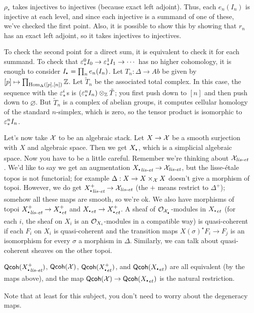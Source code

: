 $\rho_*$ takes injectives to injectives (because exact left adjoint).
Thus, each $e_n(I_n)$ is injective at each level, and since each
injective is a summand of one of these, we've checked the first
point. Also, it is possible to show this by showing that $r_n$ has an
exact left adjoint, so it takes injectives to injectives.

To check the second point for a direct sum, it is equivalent to check
it for each summand. To check that $\varepsilon_*^0I_0\to \varepsilon_*^1I_1\to\cdots$
has no higher cohomology, it is enough to consider $I_\udot = \prod_n
e_n(I_n)$. Let $T_n:\Delta\to Ab$ be given by $[p]\mapsto
\prod_{\operatorname{Hom}_\Delta([p],[n])}\mathbb{Z}$. Let $\tilde T_n$ be the associated
total complex. In this case, the sequence with the $\varepsilon_*^i$s is
$(\varepsilon_*^nI_n)\otimes_{\mathbb{Z}} \tilde T$; you first push down to $[n]$ and
then push down to $\varnothing$. But $\tilde T_n$ is a complex of
abelian groups, it computes cellular homology of the standard
$n$-simplex, which is zero, so the tensor product is isomorphic to
$\varepsilon_*^n I_n$.

Let's now take $\mathcal{X}$ to be an algebraic stack. Let $X\to \mathcal{X}$ be a
smooth surjection with $X$ and algebraic space. Then we get
$X_\udot$, which is a simplicial algebraic space. Now you have to be
a little careful. Remember we're thinking about $\mathcal{X}_{\text{\it lis-et}}$. We'd
like to say we get an augmentation $X_{\udot \liset}\to \X_\liset$,
but the lisse-\'etale topos is not functorial; for example
$\Delta:X\to X\times_{\mathcal{X}} X$ doesn't give a morphism of topoi. However,
we do get $X_{\udot \liset}^+\to \X_\liset$ (the $+$ means restrict
to $\Delta^+$); somehow all these maps are smooth, so we're ok. We
also have morphisms of topoi $X_{\udot \liset}^+\to X_{\udot et}^+$
and $X_{\udot et}\to X_{\udot et}^+$. A sheaf of
$\O_{\X_\udot}$-modules in $X_{\udot et}$ (for each $i$, the sheaf on
$X_i$ is an $\mathcal{O}_{X_i}$-modules in a compatible way) is quasi-coherent
if each $F_i$ on $X_i$ is quasi-coherent and the transition maps
$X(\sigma)^\star F_i\to F_j$ is an isomorphism for every $\sigma$ a
morphism in $\Delta$. Similarly, we can talk about quasi-coherent
sheaves on the other topoi.
\begin{theorem}
  $\qco(X_{\udot \liset}^+)$, $\text{\sf Qcoh}(\mathcal{X})$, $\qco(X_{\udot et}^+)$, and
$\qco(X_{\udot et})$ are all equivalent (by the maps above), and the
map $\qco(\X)\to \qco(X_{\udot et})$ is the natural restriction.
\end{theorem}
Note that at least for this subject, you don't need to worry about
the degeneracy maps.

